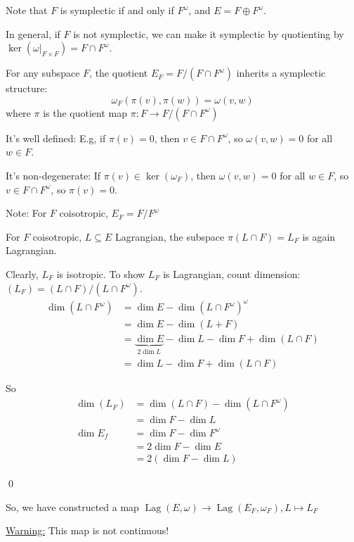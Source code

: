 \documentclass[x11names,reqno,14pt]{extarticle}
\DeclareMathOperator{\Lag}{Lag}
\begin{document}
Note that $F$ is symplectic if and only if $F^\omega$, and $E = F \oplus F^\omega$.

In general, if $F$ is not symplectic, we can make it symplectic by quotienting by $\ker(\omega|_{F\times F}) = F\cap F^\omega$. 

\prop

For any subspace $F$, the quotient $E_F = F/(F\cap F^\omega)$ inherits a symplectic structure: 
\[
\omega_F(\pi(v), \pi(w)) = \omega(v, w)
\]
where $\pi$ is the quotient map $\pi:F\to F/(F\cap F^\omega)$

\proof

It's well defined: E.g, if $\pi(v) = 0$, then $v \in F \cap F^\omega$, so $\omega(v, w) = 0$ for all $w\in F$. 

It's non-degenerate: If $\pi(v)\in \ker(\omega_F)$, then $\omega(v, w) = 0$ for all $w \in F$, so $v \in F \cap F^\omega$, so $\pi(v) = 0$. 

Note: For $F$ coisotropic, $E_F = F/F^\omega$

\prop

For $F$ coisotropic, $L \subseteq E$ Lagrangian, the subspace $\pi(L\cap F) = L_F$ is again Lagrangian.

\proof

Clearly, $L_F$ is isotropic. To show $L_F$ is Lagrangian, count dimension: $(L_F) = (L \cap F)/(L \cap F^\omega)$.
\begin{align*}
\dim (L \cap F^\omega) & = \dim E - \dim (L \cap F^\omega)^\omega \\
& = \dim E - \dim (L + F) \\
& = \underbrace{\dim E}_{2\dim L} - \dim L - \dim F + \dim(L\cap F)\\
& = \dim L - \dim F + \dim (L \cap F)
\end{align*}

So 
\begin{align*}
\dim (L_F) & = \dim(L\cap F) - \dim(L\cap F^\omega) \\
& = \dim F - \dim L \\
\dim E_f & = \dim F - \dim F^\omega \\& = 2\dim F - \dim E \\ & = 2(\dim F - \dim L) 
\end{align*}

\qed

So, we have constructed a map $\Lag(E, \omega) \to \Lag(E_F, \omega_F), L \mapsto L_F$

\underline{Warning:} This map is not continuous!
\end{document}
